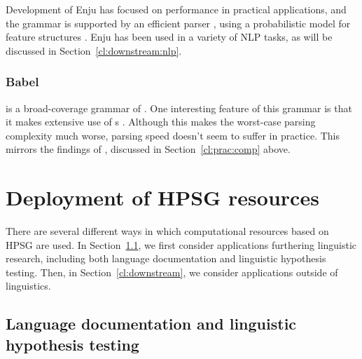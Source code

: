\documentclass[output=paper
	        ,collection
	        ,collectionchapter
 	        ,biblatex
                ,babelshorthands
                ,newtxmath
                ,draftmode
                ,colorlinks, citecolor=brown
]{langscibook}
\begin{document}
Development of Enju has focused on performance in practical applications,
and the grammar is supported by an efficient parser \citep{tsuruoka2004enju,matsuzaki2007supertag},
using a probabilistic model for feature structures \citep{MT2008a-u}.
Enju has been used in a variety of NLP tasks, as will be discussed in Section~\ref{cl:downstream:nlp}.

\subsubsection{Babel}
\label{cl:other:babel}

 is a broad-coverage grammar of  \citep{Babel,Mueller99a}.
One interesting feature of this grammar is that
it makes extensive use of s \citep{Mueller2004b}.
Although this makes the worst-case parsing complexity much worse,
parsing speed doesn't seem to suffer in practice.
This mirrors the findings of \citet{Carroll94},
discussed in Section~\ref{cl:prac:comp} above.






\section{Deployment of HPSG resources}
\label{cl:deployment}

There are several different ways in which computational resources
based on HPSG are used.
In Section~\ref{cl:lang-doc}, we first consider applications furthering linguistic research,
including both language documentation and linguistic hypothesis testing.
Then, in Section~\ref{cl:downstream}, we consider applications outside of linguistics.


\subsection{Language documentation and linguistic hypothesis testing}
\label{cl:lang-doc}
\end{document}
